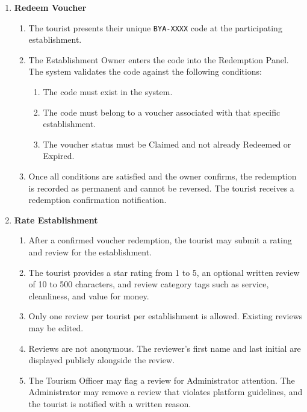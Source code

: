 \documentclass{research}
\begin{document}
\begin{enumerate}
    \item \textbf{Redeem Voucher}
    \begin{enumerate}
        \item The tourist presents their unique \texttt{BYA-XXXX} code at 
        the participating establishment.
        \item The Establishment Owner enters the code into the Redemption 
        Panel. The system validates the code against the following 
        conditions:
        \begin{enumerate}
            \item The code must exist in the system.
            \item The code must belong to a voucher associated with that 
            specific establishment.
            \item The voucher status must be Claimed and not already 
            Redeemed or Expired.
        \end{enumerate}
        \item Once all conditions are satisfied and the owner confirms, the 
        redemption is recorded as permanent and cannot be reversed. The 
        tourist receives a redemption confirmation notification.
    \end{enumerate}

    \item \textbf{Rate Establishment}
    \begin{enumerate}
        \item After a confirmed voucher redemption, the tourist may submit 
        a rating and review for the establishment.
        \item The tourist provides a star rating from 1 to 5, an optional 
        written review of 10 to 500 characters, and review category tags 
        such as service, cleanliness, and value for money.
        \item Only one review per tourist per establishment is allowed. 
        Existing reviews may be edited.
        \item Reviews are not anonymous. The reviewer's first name and last 
        initial are displayed publicly alongside the review.
        \item The Tourism Officer may flag a review for Administrator 
        attention. The Administrator may remove a review that violates 
        platform guidelines, and the tourist is notified with a written 
        reason.
    \end{enumerate}


\end{enumerate}
\end{document}
